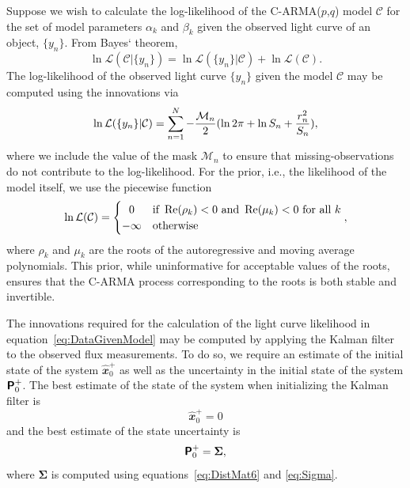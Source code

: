 \documentclass[a4paper,fleqn,usenatbib]{mnras}
\begin{document}
Suppose we wish to calculate the log-likelihood of the C-ARMA($p$,$q$) model $\mathcal{C}$ for the set of model parameters $\alpha_{k}$ and $\beta_{k}$ given the observed light curve of an object, $\{y_{n}\}$. From Bayes` theorem, 
\begin{equation}\label{eq:ModelGivenData}
\ln \mathcal{L}(\mathcal{C}|\{y_{n}\}) = \ln \mathcal{L}(\{y_{n}\}|\mathcal{C}) + \ln \mathcal{L}(\mathcal{C}).
\end{equation}
The log-likelihood of the observed light curve $\{y_{n}\}$ given the model $\mathcal{C}$ may be computed using the innovations via
\begin{equation}\label{eq:DataGivenModel}
\ln \mathcal{L}(\{y_{n}\}|\mathcal{C}) = \sum_{n = 1}^{N} -\frac{\mathcal{M}_{n}}{2}(\ln 2 \pi + \ln S_{n} + \frac{r_{n}^{2}}{S_{n}}),
\end{equation}
where we include the value of the mask $\mathcal{M}_{n}$ to ensure that missing-observations do not contribute to the log-likelihood. For the prior, i.e., the likelihood of the model itself, we use the piecewise function
\begin{equation}\label{eq:Prior}
\ln \mathcal{L}(\mathcal{C}) =
  \begin{cases} 
      \hfill 0    \hfill & \text{if~} \operatorname{Re}(\rho_{k}) < 0 \text{~and~} \operatorname{Re}(\mu_{k}) < 0 \text{~for all~} k  \\
      \hfill -\infty \hfill & \text{otherwise}
  \end{cases},
\end{equation}
where $\rho_{k}$ and $\mu_{k}$ are the roots of the autoregressive and moving average polynomials. This prior, while uninformative for acceptable values of the roots, ensures that the C-ARMA process corresponding to the roots is both stable and invertible.

The innovations required for the calculation of the light curve likelihood in equation~\eqref{eq:DataGivenModel} may be computed by applying the Kalman filter to the observed flux measurements. To do so, we require an estimate of the initial state of the system $\widehat{\mathbfit{x}}^{+}_{0}$ as well as the uncertainty in the initial state of the system $\textbf{\textsf{P}}^{+}_{0}$. The best estimate of the state of the system when initializing the Kalman filter is
\begin{equation}\label{eq:x0}
\widehat{\mathbfit{x}}^{+}_{0} = \mathbfit{0}
\end{equation}
and the best estimate of the state uncertainty is
\begin{equation}\label{eq:P0}
\textbf{\textsf{P}}^{+}_{0} = \boldsymbol{\Sigma},
\end{equation}
where $\boldsymbol{\Sigma}$ is computed using equations~\eqref{eq:DistMat6} and \eqref{eq:Sigma}.
\end{document}
